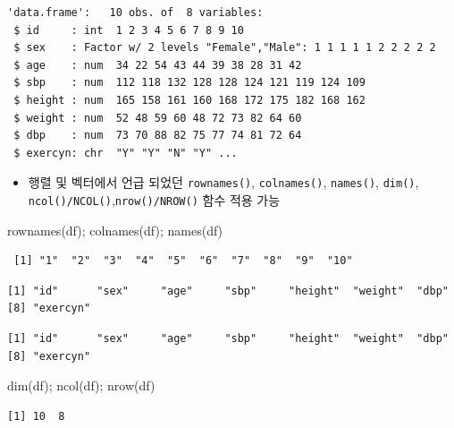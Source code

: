 \documentclass[
  11pt,
]{krantz}
\newenvironment{Shaded}{\begin{snugshade}}{\end{snugshade}}
\newcommand{\FunctionTok}[1]{\textcolor[rgb]{0,0,0}{#1}}
\newcommand{\NormalTok}[1]{#1}
\providecommand{\tightlist}{%
  \setlength{\itemsep}{0pt}\setlength{\parskip}{0pt}}
\begin{document}
\begin{verbatim}
'data.frame':   10 obs. of  8 variables:
 $ id     : int  1 2 3 4 5 6 7 8 9 10
 $ sex    : Factor w/ 2 levels "Female","Male": 1 1 1 1 1 2 2 2 2 2
 $ age    : num  34 22 54 43 44 39 38 28 31 42
 $ sbp    : num  112 118 132 128 128 124 121 119 124 109
 $ height : num  165 158 161 160 168 172 175 182 168 162
 $ weight : num  52 48 59 60 48 72 73 82 64 60
 $ dbp    : num  73 70 88 82 75 77 74 81 72 64
 $ exercyn: chr  "Y" "Y" "N" "Y" ...
\end{verbatim}

\normalsize

\begin{itemize}
\tightlist
\item
  행렬 및 벡터에서 언급 되었던 \texttt{rownames()}, \texttt{colnames()}, \texttt{names()}, \texttt{dim()}, \texttt{ncol()/NCOL()},\texttt{nrow()/NROW()} 함수 적용 가능
\end{itemize}

\footnotesize

\begin{Shaded}
\begin{Highlighting}[]
\FunctionTok{rownames}\NormalTok{(df); }\FunctionTok{colnames}\NormalTok{(df); }\FunctionTok{names}\NormalTok{(df)}
\end{Highlighting}
\end{Shaded}

\begin{verbatim}
 [1] "1"  "2"  "3"  "4"  "5"  "6"  "7"  "8"  "9"  "10"
\end{verbatim}

\begin{verbatim}
[1] "id"      "sex"     "age"     "sbp"     "height"  "weight"  "dbp"    
[8] "exercyn"
\end{verbatim}

\begin{verbatim}
[1] "id"      "sex"     "age"     "sbp"     "height"  "weight"  "dbp"    
[8] "exercyn"
\end{verbatim}

\begin{Shaded}
\begin{Highlighting}[]
\FunctionTok{dim}\NormalTok{(df); }\FunctionTok{ncol}\NormalTok{(df); }\FunctionTok{nrow}\NormalTok{(df)}
\end{Highlighting}
\end{Shaded}

\begin{verbatim}
[1] 10  8
\end{verbatim}
\end{document}
